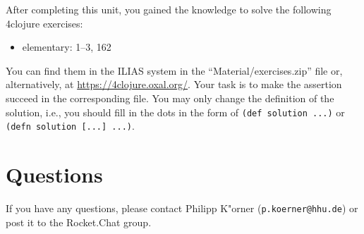 \documentclass[11pt,a4paper]{article}
\begin{document}
    \begin{exercise}
        After completing this unit, you gained the knowledge to solve the following 4clojure exercises:

        \begin{itemize}
            \item elementary: 1--3, 162
        \end{itemize}

        \noindent You can find them in the ILIAS system in the ``Material/exercises.zip'' file or, alternatively,
        at \url{https://4clojure.oxal.org/}.
        Your task is to make the assertion succeed in the corresponding file.
        You may only change the definition of the solution, i.e., you should fill in the dots in the form of \verb|(def solution ...)| or \verb|(defn solution [...] ...)|.
    \end{exercise}
	
	
    \enlargethispage{2\baselineskip}
	\section*{Questions}
	If you have any questions, please contact Philipp K"orner (\texttt{p.koerner@hhu.de}) or post it to the Rocket.Chat group.
\end{document}
